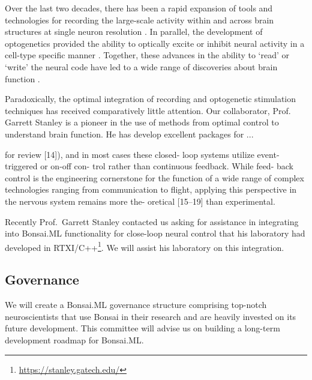 Over the last two decades, there has been a rapid
expansion of tools and technologies for recording the
large-scale activity within and across brain structures
at single neuron resolution \citep{}. In parallel, the
development of optogenetics provided the ability to
optically excite or inhibit neural activity in a cell-type
specific manner \citep{}. Together, these advances in the
ability to `read' or `write' the neural code have led
to a wide range of discoveries about brain function \citep{}.

Paradoxically, the optimal integration of recording and optogenetic stimulation
techniques has received comparatively little attention. Our collaborator,
Prof.~ Garrett Stanley is a pioneer in the use of methods from optimal control
to understand brain function. He has develop excellent packages for ...

for review [14]), and in most cases these closed-
loop systems utilize event-triggered or on-off con-
trol rather than continuous feedback. While feed-
back control is the engineering cornerstone for the
function of a wide range of complex technologies
ranging from communication to flight, applying this
perspective in the nervous system remains more the-
oretical [15–19] than experimental.

Recently Prof.~Garrett
Stanley contacted us asking for assistance in integrating into Bonsai.ML
functionality for close-loop neural control that his laboratory had developed
in RTXI/C++\footnote[6]{\url{https://stanley.gatech.edu/}}. We will assist his
laboratory on this integration.

\subsection*{Governance}

We will create a Bonsai.ML governance structure comprising top-notch
neuroscientists that use Bonsai in their research and are heavily invested on
its future development.
%
This committee will advise us on building a long-term development roadmap for
Bonsai.ML.
